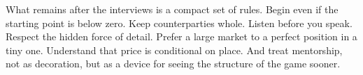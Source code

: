 What remains after the interviews is a compact set of rules. Begin even if the starting point is below zero. Keep counterparties whole. Listen before you speak. Respect the hidden force of detail. Prefer a large market to a perfect position in a tiny one. Understand that price is conditional on place. And treat mentorship, not as decoration, but as a device for seeing the structure of the game sooner.